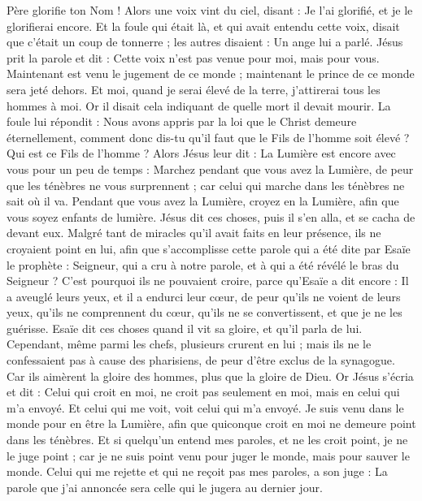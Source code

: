 \begin{multicols}{2}
Père glorifie ton Nom ! Alors une voix vint du ciel, disant : Je l'ai glorifié, et je le glorifierai encore.
Et la foule qui était là, et qui avait entendu cette voix, disait que c'était un coup de tonnerre ; les autres disaient : Un ange lui a parlé.
Jésus prit la parole et dit : Cette voix n'est pas venue pour moi, mais pour vous.
Maintenant est venu le jugement de ce monde ; maintenant le prince de ce monde sera jeté dehors.
Et moi, quand je serai élevé de la terre, j'attirerai tous les hommes à moi.
Or il disait cela indiquant de quelle mort il devait mourir.
La foule lui répondit : Nous avons appris par la loi que le Christ demeure éternellement, comment donc dis-tu qu'il faut que le Fils de l'homme soit élevé ? Qui est ce Fils de l'homme ?
Alors Jésus leur dit : La Lumière est encore avec vous pour un peu de temps : Marchez pendant que vous avez la Lumière, de peur que les ténèbres ne vous surprennent ; car celui qui marche dans les ténèbres ne sait où il va.
Pendant que vous avez la Lumière, croyez en la Lumière, afin que vous soyez enfants de lumière. Jésus dit ces choses, puis il s'en alla, et se cacha de devant eux.
Malgré tant de miracles qu'il avait faits en leur présence, ils ne croyaient point en lui,
afin que s'accomplisse cette parole qui a été dite par Esaïe le prophète : Seigneur, qui a cru à notre parole, et à qui a été révélé le bras du Seigneur ?
C'est pourquoi ils ne pouvaient croire, parce qu'Esaïe a dit encore :
Il a aveuglé leurs yeux, et il a endurci leur cœur, de peur qu'ils ne voient de leurs yeux, qu'ils ne comprennent du cœur, qu'ils ne se convertissent, et que je ne les guérisse.
Esaïe dit ces choses quand il vit sa gloire, et qu'il parla de lui.
Cependant, même parmi les chefs, plusieurs crurent en lui ; mais ils ne le confessaient pas à cause des pharisiens, de peur d'être exclus de la synagogue.
Car ils aimèrent la gloire des hommes, plus que la gloire de Dieu.
Or Jésus s'écria et dit : Celui qui croit en moi, ne croit pas seulement en moi, mais en celui qui m'a envoyé.
Et celui qui me voit, voit celui qui m'a envoyé.
Je suis venu dans le monde pour en être la Lumière, afin que quiconque croit en moi ne demeure point dans les ténèbres.
Et si quelqu'un entend mes paroles, et ne les croit point, je ne le juge point ; car je ne suis point venu pour juger le monde, mais pour sauver le monde.
Celui qui me rejette et qui ne reçoit pas mes paroles, a son juge : La parole que j'ai annoncée sera celle qui le jugera au dernier jour.

\end{multicols}
